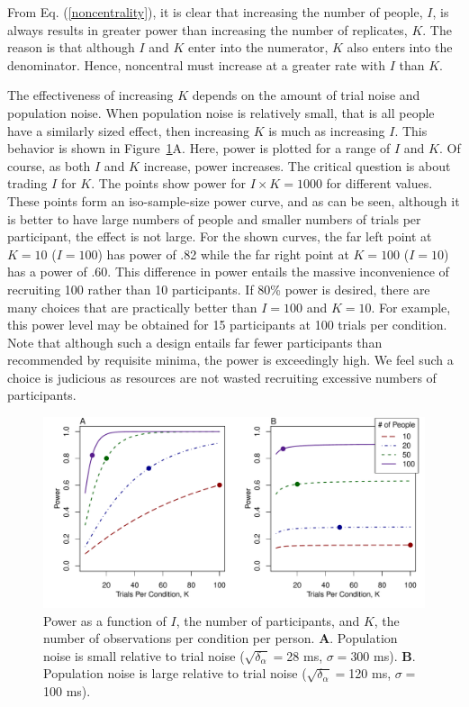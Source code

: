\documentclass[fignum,nobf,man]{apa}
\begin{document}
From Eq. (\ref{noncentrality}), it is clear that increasing the number of people, $I$, is always results in greater power than increasing the number of replicates, $K$.   The reason is that although $I$ and $K$ enter into the numerator, $K$ also enters into the denominator.  Hence, noncentral must increase at a greater rate with $I$ than $K$.

The effectiveness of increasing $K$ depends on the amount of trial noise and population noise.  When population noise is relatively small, that is all people have a similarly sized effect, then increasing $K$ is much as increasing $I$.  This behavior is shown in Figure~\ref{tradeoff}A.  Here, power is plotted for a range of $I$ and $K$.  Of course, as both $I$ and $K$ increase, power increases.  The critical question is about trading $I$ for $K$.  The points show power for $I\times K=1000$ for different values.  These points form an iso-sample-size power curve, and as can be seen, although it is better to have large numbers of people and smaller numbers of trials per participant, the effect is not large.  For the shown curves, the far left point at $K=10$ ($I=100$) has power of .82 while the far right point at $K=100$ ($I=10$) has a power of .60.  This difference in power entails the massive inconvenience of recruiting 100 rather than 10 participants.  If 80\% power is desired, there are many choices that are practically better than $I=100$ and $K=10$.  For example, this power level may be obtained for 15 participants at 100 trials per condition.  Note that although such a design entails  far fewer participants than recommended by requisite minima, the power is exceedingly high.  We feel such a choice is judicious as resources are not wasted recruiting excessive numbers of participants.  


\begin{figure}
\includegraphics[width=7in]{tradeoff.pdf}
\caption{Power as a function of $I$, the number of participants, and $K$, the number of observations per condition per person.  {\bf A}.  Population noise is small relative to trial noise ($\sqrt{\delta_\alpha}=$28 ms, $\sigma=$300 ms).  {\bf B}.  Population noise is large relative to trial noise ($\sqrt{\delta_\alpha}=$120 ms, $\sigma=$100 ms). }
\label{tradeoff}
\end{figure}
\end{document}
